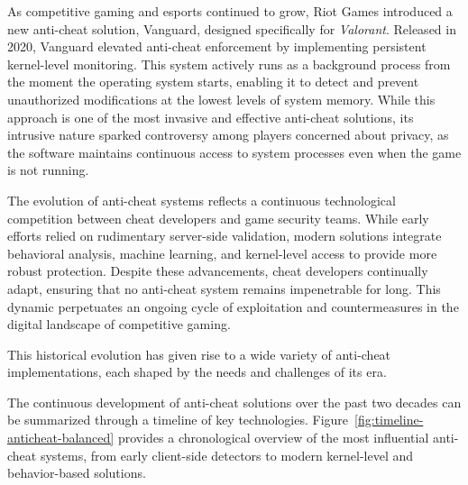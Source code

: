 As competitive gaming and esports continued to grow, Riot Games introduced a new anti-cheat solution, Vanguard, designed specifically for \textit{Valorant}. Released in 2020, Vanguard elevated anti-cheat enforcement by implementing persistent kernel-level monitoring. This system actively runs as a background process from the moment the operating system starts, enabling it to detect and prevent unauthorized modifications at the lowest levels of system memory. While this approach is one of the most invasive and effective anti-cheat solutions, its intrusive nature sparked controversy among players concerned about privacy, as the software maintains continuous access to system processes even when the game is not running.

The evolution of anti-cheat systems reflects a continuous technological competition between cheat developers and game security teams. While early efforts relied on rudimentary server-side validation, modern solutions integrate behavioral analysis, machine learning, and kernel-level access to provide more robust protection. Despite these advancements, cheat developers continually adapt, ensuring that no anti-cheat system remains impenetrable for long. This dynamic perpetuates an ongoing cycle of exploitation and countermeasures in the digital landscape of competitive gaming.

This historical evolution has given rise to a wide variety of anti-cheat implementations, each shaped by the needs and challenges of its era.

The continuous development of anti-cheat solutions over the past two decades can be summarized through a timeline of key technologies. Figure~\ref{fig:timeline-anticheat-balanced} provides a chronological overview of the most influential anti-cheat systems, from early client-side detectors to modern kernel-level and behavior-based solutions.

